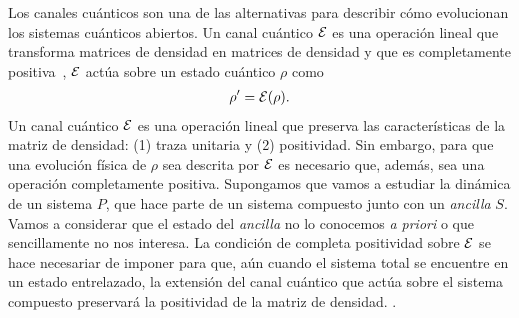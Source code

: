 Los canales cuánticos son una de las alternativas para describir cómo
evolucionan los sistemas cuánticos abiertos.
Un canal cuántico $\mathcal{E}$ es una operación lineal que transforma matrices
de densidad en matrices de densidad y que es
completamente positiva~\cite{bengtsson_zyczkowski_2017},
$\mathcal{E}$ actúa sobre un estado cuántico $\rho$ como
\begin{align} \label{eq:E(rho)}
\rho' = \mathcal{E} (\rho).
\end{align} 
Un canal cuántico $\mathcal{E}$ es una operación lineal 
que preserva las características de la matriz de densidad: (1) traza
unitaria y (2) positividad. Sin embargo, para que una evolución física 
de $\rho$ sea descrita por $\mathcal{E}$ es necesario que, además, sea una  
operación completamente positiva. Supongamos que vamos a estudiar 
la dinámica de un sistema $P$, que hace parte de un sistema compuesto
junto con un \textit{ancilla} $S$. Vamos a considerar que el 
estado del \textit{ancilla} no lo conocemos \textit{a priori} o que 
sencillamente no nos interesa. La condición de completa positividad
sobre $\mathcal{E}$ se hace necesariar de imponer para que, aún cuando
el sistema total se encuentre en un estado entrelazado,
la extensión del canal cuántico que actúa sobre el 
sistema compuesto preservará la positividad de 
la matriz de densidad.
.

 

